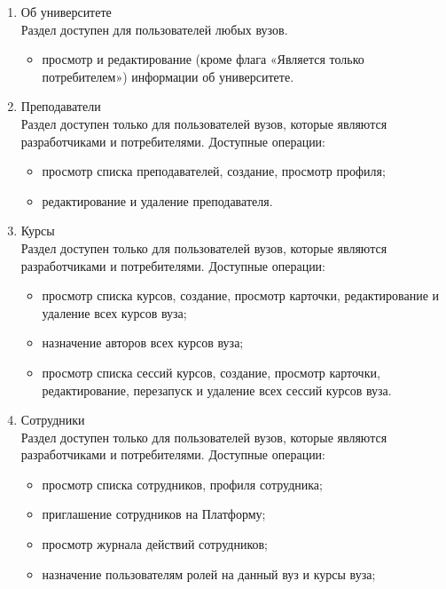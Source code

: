 \begin{enumerate}

	\item Об университете\\
	Раздел доступен для пользователей любых вузов.
	\begin{itemize}
		\item просмотр и редактирование (кроме флага «Является только потребителем») информации об университете.
	\end{itemize}

	\item Преподаватели\\
	Раздел доступен только для пользователей вузов, которые являются разработчиками и потребителями. Доступные операции:
	\begin{itemize}
			\item просмотр списка преподавателей, создание, просмотр профиля;
			\item редактирование и удаление преподавателя.
	\end{itemize}

	\item Курсы\\
	Раздел доступен только для пользователей вузов, которые являются разработчиками и потребителями. Доступные операции:
	\begin{itemize}
			\item просмотр списка курсов, создание, просмотр карточки, редактирование и удаление всех курсов вуза;
			\item назначение авторов всех курсов вуза;
			\item просмотр списка сессий курсов, создание, просмотр карточки, редактирование, перезапуск и удаление всех сессий курсов вуза.
	\end{itemize}

	\item Сотрудники\\
	Раздел доступен только для пользователей вузов, которые являются разработчиками и потребителями. Доступные операции:
	\begin{itemize}
		\item просмотр списка сотрудников, профиля сотрудника; 
		\item приглашение сотрудников на Платформу;
		\item просмотр журнала действий сотрудников;
		\item назначение пользователям ролей на данный вуз и курсы вуза;
	\end{itemize}


\end{enumerate}
